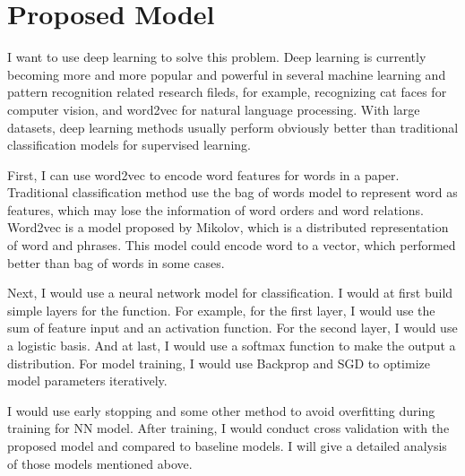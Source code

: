 \documentclass{article} %
\begin{document}
\section{Proposed Model}
I want to use deep learning to solve this problem. Deep learning is currently
becoming more and more popular and powerful in several machine learning and
pattern recognition related research fileds, for example, recognizing cat faces
for computer vision, and word2vec for natural language processing. With large
datasets, deep learning methods usually perform obviously better than
traditional classification models for supervised learning.

First, I can use word2vec to encode word features for words in a paper.
Traditional classification method use the bag of words model to represent word
as features, which may lose the information of word orders and word relations.
Word2vec is a model proposed by Mikolov, which is a distributed representation
of word and phrases. This model could encode word to a vector, which performed
better than bag of words in some cases.

Next, I would use a neural network model for classification. I would at first
build simple layers for the function. For example, for the first layer, I would
use the sum of feature input and an activation function. For the second layer, I
would use a logistic basis. And at last, I would use a softmax function to make
the output a distribution. For model training, I would use Backprop and SGD to
optimize model parameters iteratively.

I would use early stopping and some other method to avoid overfitting during
training for NN model. After training, I would conduct cross validation with the
proposed model and compared to baseline models. I will give a detailed analysis
of those models mentioned above.
\end{document}
